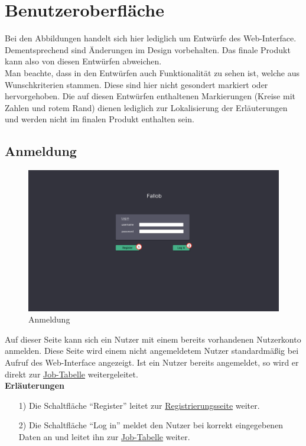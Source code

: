 \section{Benutzeroberfläche}

Bei den Abbildungen handelt sich hier lediglich um Entwürfe des \gls{Web-Interface}. Dementsprechend sind Änderungen im Design vorbehalten. Das finale Produkt kann also von diesen Entwürfen abweichen.\\
Man beachte, dass in den Entwürfen auch Funktionalität zu sehen ist, welche aus Wunschkriterien stammen. Diese sind hier nicht gesondert markiert oder hervorgehoben. Die auf diesen Entwürfen enthaltenen Markierungen (Kreise mit Zahlen und rotem Rand) dienen lediglich zur Lokalisierung der Erläuterungen und werden nicht im finalen Produkt enthalten sein.
\subsection{Anmeldung}
\label{pages:login}
\begin{figure}[H]
    \centering
    \includegraphics[width=\textwidth]{images-interface/v4_interface/login_page_4.pdf}
    \caption{Anmeldung}
    \label{fig:login}
\end{figure}
Auf dieser Seite kann sich ein \gls{Nutzer} mit einem bereits vorhandenen \gls{Nutzerkonto} anmelden. Diese Seite wird einem nicht angemeldetem \gls{Nutzer} standardmäßig bei Aufruf des \gls{Web-Interface} angezeigt. Ist ein \gls{Nutzer} bereits angemeldet, so wird er direkt zur \hyperref[pages:job-table]{Job-Tabelle} weitergeleitet.\\
\newpage
\textbf{Erläuterungen}
\begin{itemize}
    \item[1)] Die Schaltfläche \enquote{Register} leitet zur \hyperref[pages:register]{Registrierungsseite} weiter.
    \item[2)] Die Schaltfläche \enquote{Log in} meldet den \gls{Nutzer} bei korrekt eingegebenen Daten an und leitet ihn zur \hyperref[pages:job-table]{Job-Tabelle} weiter.
\end{itemize}

